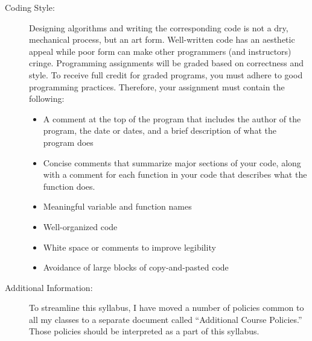 \documentclass [letterpaper,11pt]{article}
\begin{document}
\begin{description}
\item[Coding Style:]
Designing algorithms and writing the corresponding code is not a dry, mechanical process, but an art form.  Well-written code has an aesthetic appeal while poor form can make other programmers (and instructors) cringe. Programming assignments will be graded based on correctness and style. To receive full credit for graded programs, you must adhere to good programming practices. Therefore, your assignment must contain the following:
\begin{itemize}\setlength{\itemsep}{0em}\setlength{\parskip}{0pt}
	\item A comment at the top of the program that includes the author of the program,
	the date or dates, and a brief description of what the program does
	\item Concise comments that summarize major sections of your code, along with a comment
	for each function in your code that describes what the function does.
	\item Meaningful variable and function names
	\item Well-organized code
	\item White space or comments to improve legibility
	\item Avoidance of large blocks of copy-and-pasted code
\end{itemize}


\item[Additional Information:] To streamline this syllabus, I have moved a number of policies
common to all my classes to a separate document called ``Additional Course Policies.'' 
Those policies should be interpreted as a part of this syllabus.





   
\end{description}
\end{document}
